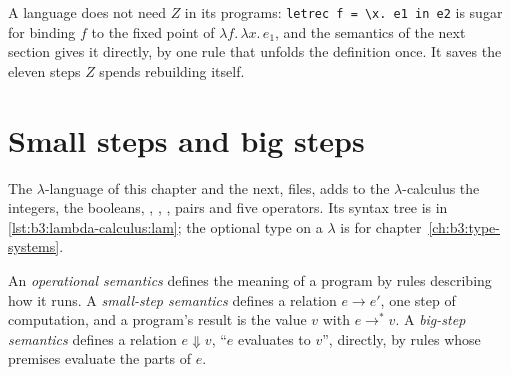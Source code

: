 \label{out:b3:lambda-calculus:ycomb}

A language does not need $Z$ in its programs: \texttt{letrec f = \textbackslash{}x.\ e1 in e2} is sugar for binding $f$ to the fixed point of $\lambda f.\,\lambda x.\,e_1$, and the semantics of the next section gives it directly, by one rule that unfolds the definition once. It saves the eleven steps $Z$ spends rebuilding itself.

\section{Small steps and big steps}\label{sec:b3:lambda-calculus:semantics}

The $\lambda$-language of this chapter and the next,  files, adds to the $\lambda$-calculus the integers, the booleans, , , , pairs and five operators. Its syntax tree is in \cref{lst:b3:lambda-calculus:lam}; the optional type on a $\lambda$ is for chapter~\ref{ch:b3:type-systems}.

\label{lst:b3:lambda-calculus:lam}

\begin{definition}\label{def:b3:lambda-calculus:semantics}
An \emph{operational semantics} defines the meaning of a program by rules describing how it runs. A \emph{small-step semantics} defines a relation $e \to e'$, one step of computation, and a program's result is the value $v$ with $e \to^* v$. A \emph{big-step semantics} defines a relation $e \Downarrow v$, ``$e$ evaluates to $v$'', directly, by rules whose premises evaluate the parts of $e$.
\end{definition}

